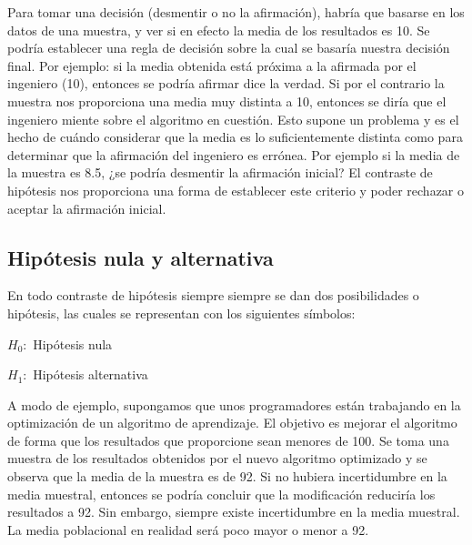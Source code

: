 Para tomar una decisión (desmentir o no la afirmación), habría que basarse en los datos de una muestra, y
ver si en efecto la media de los resultados es 10. Se podría establecer una regla de decisión sobre la cual
se basaría nuestra decisión final. Por ejemplo: si la media obtenida está próxima a la afirmada por el
ingeniero (10), entonces se podría afirmar dice la verdad. Si por el contrario la muestra nos proporciona
una media muy distinta a 10, entonces se diría que el ingeniero miente sobre el algoritmo en cuestión. Esto
supone un problema y es el hecho de cuándo considerar que la media es lo suficientemente distinta como para
determinar que la afirmación del ingeniero es errónea. Por ejemplo si la media de la muestra es 8.5, ¿se
podría desmentir la afirmación inicial? El contraste de hipótesis nos proporciona una forma de establecer
este criterio y poder rechazar o aceptar la afirmación inicial.

\subsection{Hipótesis nula y alternativa}
En todo contraste de hipótesis siempre siempre se dan dos posibilidades o hipótesis, las cuales se representan
con los siguientes símbolos:
\begin{center}
$H_0:$ Hipótesis nula

$H_1:$ Hipótesis alternativa
\end{center}
A modo de ejemplo, supongamos que unos programadores están trabajando en la optimización de un algoritmo
de aprendizaje. El objetivo es mejorar el algoritmo de forma que los resultados que proporcione sean menores
de 100. Se toma una muestra de los resultados obtenidos por el nuevo algoritmo optimizado y se observa que la
media de la muestra es de 92. Si no hubiera incertidumbre en la media muestral, entonces se podría concluir
que la modificación reduciría los resultados a 92. Sin embargo, siempre existe incertidumbre en la media
muestral. La media poblacional en realidad será poco mayor o menor a 92.

